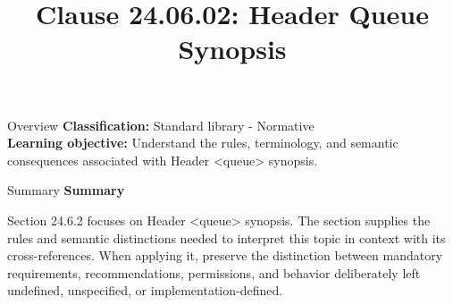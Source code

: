 \documentclass[10pt,letterpaper]{article}
\title{Clause 24.06.02: Header Queue Synopsis}
\author{}
\date{}
\begin{document}
\maketitle
\begin{CornellOverviewBox}{Overview}
\textbf{Classification:} Standard library - Normative\\[2pt]
\textbf{Learning objective:} Understand the rules, terminology, and semantic consequences associated with Header <queue> synopsis.
\end{CornellOverviewBox}\begin{CornellSummaryBox}{Summary}
{\sffamily\bfseries\color{Accent} Summary}\par\vspace{3pt}Section 24.6.2 focuses on Header <queue> synopsis. The section supplies the rules and semantic distinctions needed to interpret this topic in context with its cross-references. When applying it, preserve the distinction between mandatory requirements, recommendations, permissions, and behavior deliberately left undefined, unspecified, or implementation-defined.
\end{CornellSummaryBox}
\end{document}
